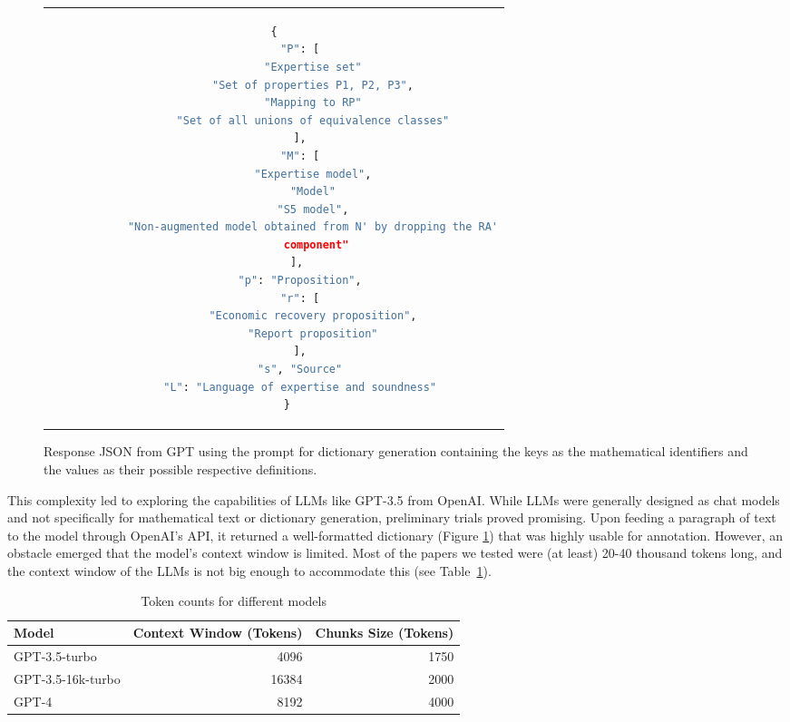 \begin{figure}[htpb]
  \centering
  \begin{tabular}{c}
  \begin{lstlisting}[language=python]
    {
        "P": [
            "Expertise set"
            "Set of properties P1, P2, P3",
            "Mapping to RP"
            "Set of all unions of equivalence classes"
        ],
        "M": [
            "Expertise model",
            "Model"
            "S5 model",
            "Non-augmented model obtained from N' by dropping the RA'
             component"
        ], 
        "p": "Proposition",
        "r": [
            "Economic recovery proposition",
            "Report proposition"
        ],
        "s", "Source"
        "L": "Language of expertise and soundness"
    }
  \end{lstlisting}
  \end{tabular}
  \caption[Response from Main Prompt for Dictionary Generation]{Response JSON from GPT using the prompt for dictionary generation containing the keys as the mathematical identifiers and the values as their possible respective definitions.}\label{fig:dic_response}
\end{figure}

This complexity led to exploring the capabilities of \ac{LLMs} like GPT-3.5 from OpenAI. While LLMs were generally designed as chat models and not specifically for mathematical text or dictionary generation, preliminary trials proved promising. Upon feeding a paragraph of text to the model through OpenAI's API, it returned a well-formatted dictionary (Figure \ref{fig:dic_response}) that was highly usable for annotation. However, an obstacle emerged that the model's context window is limited. Most of the papers we tested were (at least) 20-40 thousand tokens long, and the context window of the LLMs is not big enough to accommodate this (see Table~\ref{tab:token_counts}).

\begin{table}[h]
    \centering
    \begin{tabular}{lrr}
        \hline
        Model & Context Window (Tokens) & Chunks Size (Tokens)\\
        \hline
        GPT-3.5-turbo & 4096 & 1750 \\
        GPT-3.5-16k-turbo & 16384 & 2000 \\
        GPT-4 & 8192 & 4000 \\
        \hline
    \end{tabular}
    \caption{Token counts for different models}
    \label{tab:token_counts}
\end{table}

